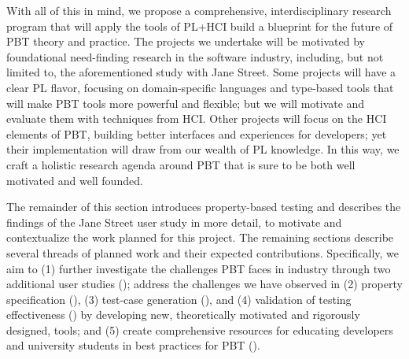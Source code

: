 With all of this in mind, we propose a comprehensive, interdisciplinary research
program that will apply the tools of PL+HCI build a blueprint for the future of
PBT theory and practice. The projects we undertake will be motivated by
foundational need-finding research in the software industry, including, but not
limited to, the aforementioned study with Jane Street. Some projects will have a
clear PL flavor, focusing on domain-specific languages and type-based tools that
will make PBT tools more powerful and flexible; but we will motivate and
evaluate them with techniques from HCI. Other projects will focus on the HCI elements
of PBT, building better interfaces and experiences for developers; yet their
implementation will draw from our wealth of PL knowledge. In this way, we craft
a holistic research agenda around PBT that is sure to be both well motivated and
well founded.

The remainder of this section introduces property-based testing and
describes the findings of the Jane Street user study in more detail,
to motivate and contextualize the work planned for this project. The
remaining sections describe several threads of planned work and their
expected contributions.  Specifically, we aim to (1) further
investigate the challenges PBT faces in industry through
two\iflater{}\fi{}  additional user studies ();
address the challenges we have observed in (2) property specification
(), (3) test-case generation
(), and (4) validation of testing effectiveness
() by developing new, theoretically motivated and
rigorously designed, tools; and (5) create comprehensive resources for
educating developers and university students in best practices for PBT
().



